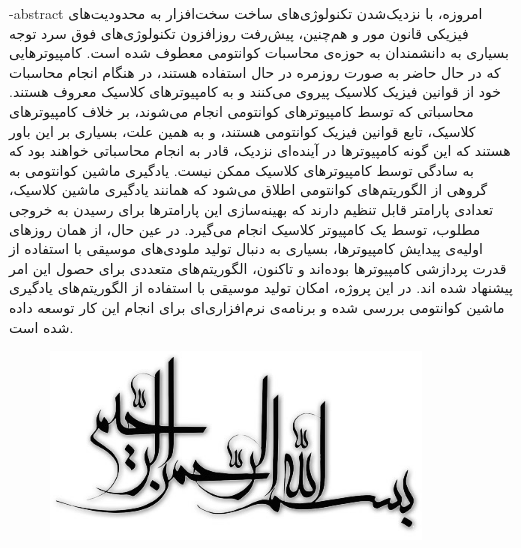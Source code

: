 \department{}

\fa-abstract{
امروزه، با نزدیک‌شدن تکنولوژی‌های ساخت سخت‌افزار به محدودیت‌های فیزیکی قانون مور
و هم‌چنین، پیش‌رفت روزافزون تکنولوژی‌های فوق سرد
توجه بسیاری به دانشمندان به حوزه‌ی محاسبات کوانتومی معطوف شده است. 
کامپیوترهایی که در حال حاضر به صورت روزمره در حال استفاده هستند، در هنگام انجام محاسبات خود از قوانین فیزیک کلاسیک پیروی می‌کنند و به کامپیوترهای کلاسیک معروف هستند.
محاسباتی که توسط کامپیوترهای کوانتومی انجام می‌شوند، بر خلاف کامپیوترهای کلاسیک، تابع قوانین فیزیک کوانتومی هستند، و به همین علت، بسیاری بر این باور هستند که این گونه کامپیوترها در آینده‌ای نزدیک، قادر به انجام محاسباتی خواهند بود که به سادگی توسط کامپیوترهای کلاسیک ممکن نیست.
یادگیری ماشین کوانتومی
به گروهی از الگوریتم‌های کوانتومی اطلاق می‌شود که همانند یادگیری ماشین کلاسیک، تعدادی پارامتر قابل تنظیم دارند که بهینه‌سازی این پارامترها برای رسیدن به خروجی مطلوب، توسط یک کامپیوتر کلاسیک انجام می‌گیرد.
در عین حال، از همان روزهای اولیه‌ی پیدایش کامپیوترها، بسیاری به دنبال تولید ملودی‌های موسیقی با استفاده از قدرت پردازشی کامپیوترها بوده‌اند و تاکنون، الگوریتم‌های متعددی برای حصول این امر پیشنهاد شده اند.
در این پروژه، امکان تولید موسیقی با استفاده از الگوریتم‌های یادگیری ماشین کوانتومی بررسی شده و برنامه‌ی نرم‌افزاری‌ای برای انجام این کار توسعه داده شده است.
}





\AUTtitle
\vspace*{7cm}
\thispagestyle{empty}
\begin{center}
\includegraphics[height=5cm,width=12cm]{figures/besm.jpg}
\end{center}
